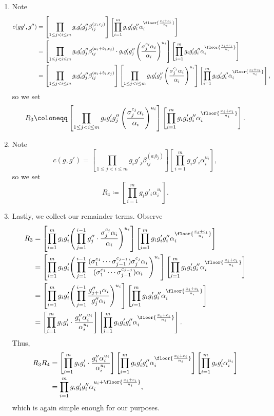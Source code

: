 \begin{enumerate}
	\item Note
	\begin{align*}
		c(gg',g'') &= \left[\prod_{1\le j<i\le m}g_ig'_ig''_j\beta_{ij}^{(x_ic_j)}\right]\left[\prod_{i=1}^mg_ig'_ig''_i\alpha_i^{\floor{\frac{x_i+c_i}{n_i}}}\right] \\
		&= \left[\prod_{1\le j<i\le m}g_ig'_ig''_j\beta_{ij}^{(a_i+b_i,c_j)}\cdot g_ig'_ig''_j\left(\frac{\sigma_j^{c_j}\alpha_i}{\alpha_i}\right)^{u_i}\right]\left[\prod_{i=1}^mg_ig'_ig''_i\alpha_i^{\floor{\frac{x_i+c_i}{n_i}}}\right] \\
		&= \left[\prod_{1\le j<i\le m}g_ig'_ig''_j\beta_{ij}^{(a_i+b_i,c_j)}\right]\left[\prod_{1\le j<i\le m}g_ig'_ig''_j\left(\frac{\sigma_j^{c_j}\alpha_i}{\alpha_i}\right)^{u_i}\right]\left[\prod_{i=1}^mg_ig'_ig''_i\alpha_i^{\floor{\frac{x_i+c_i}{n_i}}}\right],
	\end{align*}
	so we set
	\[R_3\coloneqq\left[\prod_{1\le j<i\le m}g_ig'_ig''_j\left(\frac{\sigma_j^{c_j}\alpha_i}{\alpha_i}\right)^{u_i}\right]\left[\prod_{i=1}^mg_ig'_ig''_i\alpha_i^{\floor{\frac{x_i+c_i}{n_i}}}\right].\]
	\item Note
	\[c(g,g') = \left[\prod_{1\le j<i\le m}g_ig'_j\beta_{ij}^{(a_ib_j)}\right]\left[\prod_{i=1}^mg_ig'_i\alpha_i^{u_i}\right],\]
	so we set
	\[R_4\coloneqq\left[\prod_{i=1}^mg_ig'_i\alpha_i^{u_i}\right].\]
	\item Lastly, we collect our remainder terms. Observe
	\begin{align*}
		R_3 &= \left[\prod_{i=1}^mg_ig'_i\Bigg(\prod_{j=1}^{i-1}g''_j\cdot\frac{\sigma_j^{c_j}\alpha_i}{\alpha_i}\Bigg)^{u_i}\right]\left[\prod_{i=1}^mg_ig'_ig''_i\alpha_i^{\floor{\frac{x_i+c_i}{n_i}}}\right] \\
		&= \left[\prod_{i=1}^mg_ig'_i\Bigg(\prod_{j=1}^{i-1}\frac{(\sigma_1^{c_1}\cdots\sigma_{j-1}^{c_{j-1}})\sigma_j^{c_j}\alpha_i}{(\sigma_1^{c_1}\cdots\sigma_{j-1}^{c_{j-1}})\alpha_i}\Bigg)^{u_i}\right]\left[\prod_{i=1}^mg_ig'_ig''_i\alpha_i^{\floor{\frac{x_i+c_i}{n_i}}}\right] \\
		&= \left[\prod_{i=1}^mg_ig'_i\Bigg(\prod_{j=1}^{i-1}\frac{g''_{j+1}\alpha_i}{g''_j\alpha_i}\Bigg)^{u_i}\right]\left[\prod_{i=1}^mg_ig'_ig''_i\alpha_i^{\floor{\frac{x_i+c_i}{n_i}}}\right] \\
		&= \left[\prod_{i=1}^mg_ig'_i\cdot\frac{g''_i\alpha_i^{u_i}}{\alpha_i^{u_i}}\right]\left[\prod_{i=1}^mg_ig'_ig''_i\alpha_i^{\floor{\frac{x_i+c_i}{n_i}}}\right].
	\end{align*}
	Thus,
	\begin{align*}
		R_3R_4 &= \left[\prod_{i=1}^mg_ig'_i\cdot\frac{g''_i\alpha_i^{u_i}}{\alpha_i^{u_i}}\right]\left[\prod_{i=1}^mg_ig'_ig''_i\alpha_i^{\floor{\frac{x_i+c_i}{n_i}}}\right]\left[\prod_{i=1}^mg_ig'_i\alpha_i^{u_i}\right] \\
		&= \prod_{i=1}^mg_ig'_ig''_i\alpha_i^{u_i+\floor{\frac{x_i+c_i}{n_i}}},
	\end{align*}
	which is again simple enough for our purposes.
\end{enumerate}
